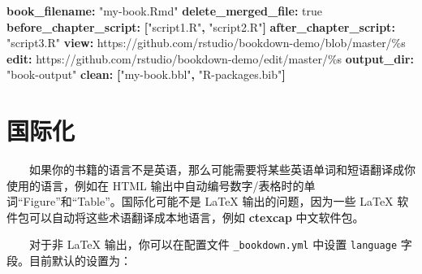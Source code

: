 \documentclass[
  12pt,
]{krantz}
\newenvironment{Shaded}{\begin{snugshade}}{\end{snugshade}}
\newcommand{\AttributeTok}[1]{\textcolor[rgb]{0.13,0.29,0.53}{#1}}
\newcommand{\CharTok}[1]{\textcolor[rgb]{0.31,0.60,0.02}{#1}}
\newcommand{\FunctionTok}[1]{\textcolor[rgb]{0.13,0.29,0.53}{\textbf{#1}}}
\newcommand{\KeywordTok}[1]{\textcolor[rgb]{0.13,0.29,0.53}{\textbf{#1}}}
\newcommand{\StringTok}[1]{\textcolor[rgb]{0.31,0.60,0.02}{#1}}
\theoremstyle{definition}
\theoremstyle{definition}
\theoremstyle{definition}
\theoremstyle{definition}
\theoremstyle{remark}
\begin{document}
\begin{Shaded}
\begin{Highlighting}[]
\FunctionTok{book\_filename}\KeywordTok{:}\AttributeTok{ }\StringTok{"my{-}book.Rmd"}
\FunctionTok{delete\_merged\_file}\KeywordTok{:}\AttributeTok{ }\CharTok{true}
\FunctionTok{before\_chapter\_script}\KeywordTok{:}\AttributeTok{ }\KeywordTok{[}\StringTok{"script1.R"}\KeywordTok{,}\AttributeTok{ }\StringTok{"script2.R"}\KeywordTok{]}
\FunctionTok{after\_chapter\_script}\KeywordTok{:}\AttributeTok{ }\StringTok{"script3.R"}
\FunctionTok{view}\KeywordTok{:}\AttributeTok{ https://github.com/rstudio/bookdown{-}demo/blob/master/\%s}
\FunctionTok{edit}\KeywordTok{:}\AttributeTok{ https://github.com/rstudio/bookdown{-}demo/edit/master/\%s}
\FunctionTok{output\_dir}\KeywordTok{:}\AttributeTok{ }\StringTok{"book{-}output"}
\FunctionTok{clean}\KeywordTok{:}\AttributeTok{ }\KeywordTok{[}\StringTok{"my{-}book.bbl"}\KeywordTok{,}\AttributeTok{ }\StringTok{"R{-}packages.bib"}\KeywordTok{]}
\end{Highlighting}
\end{Shaded}

\hypertarget{internationalization}{%
\section{国际化}\label{internationalization}}

  如果你的书籍的语言不是英语，那么可能需要将某些英语单词和短语翻译成你使用的语言，例如在 HTML 输出中自动编号数字/表格时的单词``Figure''和``Table''。国际化可能不是 LaTeX 输出的问题，因为一些 LaTeX 软件包可以自动将这些术语翻译成本地语言，例如 \textbf{ctexcap} 中文软件包。

  对于非 LaTeX 输出，你可以在配置文件 \texttt{\_bookdown.yml} 中设置 \texttt{language} 字段。目前默认的设置为：
\end{document}

